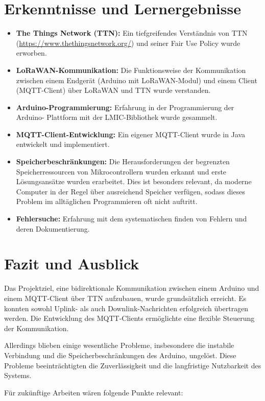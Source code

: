 \documentclass[12pt,a4paper]{article}
\begin{document}
\section{Erkenntnisse und Lernergebnisse}

\begin{itemize}
    \item \textbf{The Things Network (TTN):} Ein tiefgreifendes Verständnis von TTN (\url{https://www.thethingsnetwork.org/}) und seiner Fair Use Policy wurde erworben.
    \item \textbf{LoRaWAN-Kommunikation:} Die Funktionsweise der Kommunikation zwischen einem Endgerät (Arduino mit LoRaWAN-Modul) und einem Client (MQTT-Client) über LoRaWAN und TTN wurde verstanden.
    \item \textbf{Arduino-Programmierung:} Erfahrung in der Programmierung der Arduino- Plattform mit der LMIC-Bibliothek wurde gesammelt.
    \item \textbf{MQTT-Client-Entwicklung:} Ein eigener MQTT-Client wurde in Java entwickelt und implementiert.
    \item \textbf{Speicherbeschränkungen:} Die Herausforderungen der begrenzten Speicherressourcen von Mikrocontrollern wurden erkannt und erste Lösungsansätze wurden erarbeitet. Dies ist besonders relevant, da moderne Computer in der Regel über ausreichend Speicher verfügen, sodass dieses Problem im alltäglichen Programmieren oft nicht auftritt.
     \item \textbf{Fehlersuche:} Erfahrung mit dem systematischen finden von Fehlern und deren Dokumentierung.
\end{itemize}

\section{Fazit und Ausblick}

Das Projektziel, eine bidirektionale Kommunikation zwischen einem Arduino und einem MQTT-Client über TTN aufzubauen, wurde grundsätzlich erreicht. Es konnten sowohl Uplink- als auch Downlink-Nachrichten erfolgreich übertragen werden. Die Entwicklung des MQTT-Clients ermöglichte eine flexible Steuerung der Kommunikation.

Allerdings blieben einige wesentliche Probleme, insbesondere die instabile Verbindung und die Speicherbeschränkungen des Arduino, ungelöst. Diese Probleme beeinträchtigten die Zuverlässigkeit und die langfristige Nutzbarkeit des Systems.

Für zukünftige Arbeiten wären folgende Punkte relevant:
\end{document}
